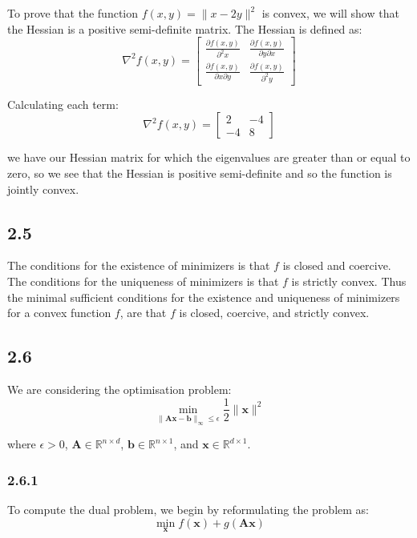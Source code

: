\documentclass[12pt]{article}
\begin{document}
To prove that the function $f(x, y) = \| x-2y\|^2$ is convex, we will show that the Hessian is a positive semi-definite matrix. The Hessian is defined as:
\[
\nabla^2 f(x, y) = \begin{bmatrix}
                 \frac{\partial f(x, y)}{\partial^2 x} & \frac{\partial f(x, y)}{\partial y \partial x}\\
                 \frac{\partial f(x, y)}{\partial x \partial y} & \frac{\partial f(x, y)}{\partial^2 y}
         \end{bmatrix}
\]

Calculating each term:
\[\nabla^2 f(x, y) = \begin{bmatrix}
                 2 & -4\\
                 -4 & 8
         \end{bmatrix}
\]

we have our Hessian matrix for which the eigenvalues are greater than or equal to zero, so we see that the Hessian is positive semi-definite and so the function is jointly convex.

\subsection*{2.5}
  The conditions for the existence of minimizers is that $f$ is closed and coercive.
  The conditions for the uniqueness of minimizers is that $f$ is strictly convex.
Thus the minimal sufficient conditions for the existence and uniqueness of minimizers for a convex function $f$, are that $f$ is closed, coercive, and strictly convex.

\subsection*{2.6}

We are considering the optimisation problem:
\[\min_{\|\textbf{A}\textbf{x} - \textbf{b}\|_{\infty} \leq \epsilon} \frac{1}{2}\|\textbf{x}\|^2\]

where $\epsilon > 0$, $\textbf{A} \in \mathbb{R}^{n\times d}$, $\textbf{b} \in \mathbb{R}^{n \times 1}$, and $\textbf{x} \in \mathbb{R}^{d \times 1}$.

\subsubsection*{2.6.1}

To compute the dual problem, we begin by reformulating the problem as:
\[\min_{\textbf{x}}  f(\textbf{x}) + g(\textbf{Ax})\]
\end{document}
